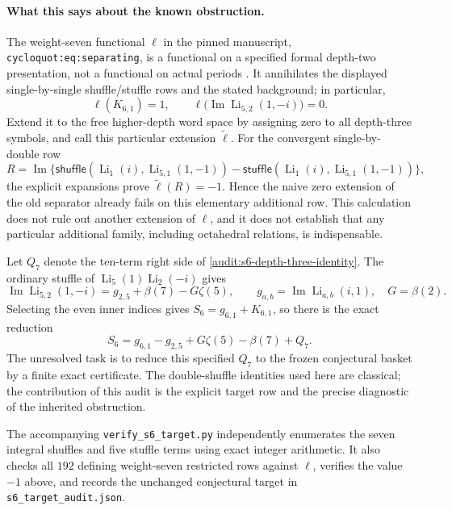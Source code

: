 \documentclass[11pt,a4paper]{article}
\theoremstyle{definition}
\theoremstyle{remark}
\DeclareMathOperator{\Li}{Li}
\numberwithin{equation}{section}
\begin{document}
\paragraph{What this says about the known obstruction.}
The weight-seven functional $\ell$ in the pinned manuscript,
\texttt{cycloquot:eq:separating}, is a functional on a specified formal
depth-two presentation, not a functional on actual periods
\cite{Repo}. It annihilates the displayed single-by-single
shuffle/stuffle rows and the stated background; in particular,
\[
 \ell(K_{6,1})=1,\qquad
 \ell\bigl(\operatorname{Im}\Li_{5,2}(1,-i)\bigr)=0.
\]
Extend it to the free higher-depth word space by assigning zero to all
depth-three symbols, and call this particular extension $\widetilde\ell$.
For the convergent single-by-double row
\[
 R=\operatorname{Im}\{\mathsf{shuffle}(\Li_1(i),\Li_{5,1}(1,-1))
               -\mathsf{stuffle}(\Li_1(i),\Li_{5,1}(1,-1))\},
\]
the explicit expansions prove $\widetilde\ell(R)=-1$. Hence the naive
zero extension of the old separator already fails on this elementary
additional row. This calculation does not rule out another extension of
$\ell$, and it does not establish that any particular additional family,
including octahedral relations, is indispensable.

Let $Q_7$ denote the ten-term right side of
\eqref{audit:s6-depth-three-identity}. The ordinary stuffle of
$\Li_5(1)\Li_2(-i)$ gives
\[
 \operatorname{Im}\Li_{5,2}(1,-i)
 =g_{2,5}+\beta(7)-G\zeta(5),
 \qquad g_{a,b}=\operatorname{Im}\Li_{a,b}(i,1),\quad G=\beta(2).
\]
Selecting the even inner indices gives
$S_6=g_{6,1}+K_{6,1}$, so there is the exact reduction
\begin{equation}
 S_6=g_{6,1}-g_{2,5}+G\zeta(5)-\beta(7)+Q_7.
 \label{audit:s6-Q-reduction}
\end{equation}
The unresolved task is to reduce this specified $Q_7$ to the frozen
conjectural basket by a finite exact certificate. The double-shuffle
identities used here are classical; the contribution of this audit is
the explicit target row and the precise diagnostic of the inherited
obstruction.

The accompanying \texttt{verify\_s6\_target.py} independently enumerates
the seven integral shuffles and five stuffle terms using exact integer
arithmetic. It also checks all $192$ defining weight-seven restricted
rows against $\ell$, verifies the value $-1$ above, and records the
unchanged conjectural target in \texttt{s6\_target\_audit.json}.

\end{document}
